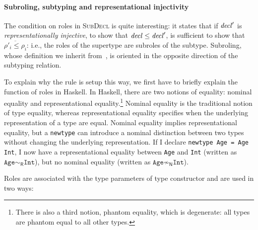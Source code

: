 \paragraph{Subroling, subtyping and representational injectivity}
The condition on roles in \textsc{SubDecl} is quite interesting:
it states that if $\mathit{decl}'$ is \emph{representationally injective},
to show that $\mathit{decl} \le \mathit{decl}'$,
is sufficient to show that $\overline{\rho'_i \le \rho_i}$: i.e.,
the roles of the supertype are subroles of the subtype.
Subroling, whose definition we inherit from~\cite{Breitner:2014:SZC:2692915.2628141},
is oriented in the opposite direction of the subtyping relation.

To explain why the rule is setup this way, we first have to briefly
explain
the function of roles in Haskell.  In Haskell, there are two notions of
equality: nominal equality and representational equality.\footnote{There is also
a third notion, phantom equality, which is degenerate: all types are phantom
equal to all other types.}  Nominal
equality is the traditional notion of type equality, whereas
representational equality specifies when the underlying representation
of a type are equal.  Nominal equality implies representational
equality, but a \verb|newtype| can introduce a nominal distinction between
two types without changing the underlying representation. If I declare
\verb|newtype Age = Age Int|, I now have a representational equality
between \verb|Age| and \verb|Int| (written as $\texttt{Age}
\sim_\textsf{R} \texttt{Int}$), but no nominal equality (written as $\texttt{Age}
\not\sim_\textsf{N} \texttt{Int}$).

Roles are associated with the type parameters of type constructor and
are used in two ways:

